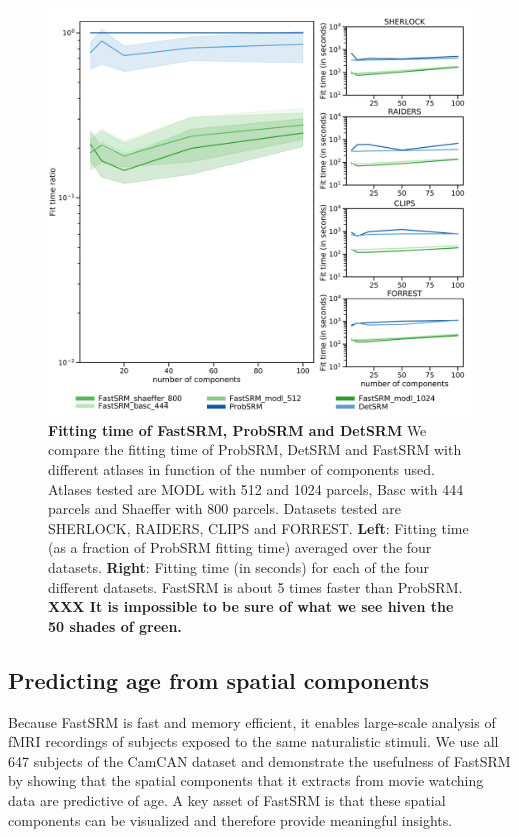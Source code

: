 \begin{figure}
\centering
\includegraphics[scale=0.33]{figures/srm/fit_time.pdf}

\caption{\textbf{Fitting time of FastSRM, ProbSRM and DetSRM} We compare the fitting time of ProbSRM, DetSRM and FastSRM with different atlases in function of the number of components used. Atlases tested are MODL with 512 and 1024 parcels, Basc with 444 parcels and Shaeffer with 800 parcels. Datasets tested are SHERLOCK, RAIDERS, CLIPS and FORREST.
\textbf{Left}: Fitting time (as a fraction of ProbSRM fitting time) averaged over the four datasets.
\textbf{Right}: Fitting time (in seconds) for each of the four different datasets.
FastSRM is about 5 times faster than ProbSRM.
\textbf{XXX It is impossible to be sure of what we see hiven the 50 shades of green.}}
\label{fig:fit_time}
\end{figure}

\subsection{Predicting age from spatial components}
Because FastSRM is fast and memory efficient, it enables large-scale analysis of fMRI recordings of subjects exposed to the same naturalistic stimuli.
%
We use all 647 subjects of the CamCAN dataset and demonstrate the usefulness of FastSRM by showing that the spatial components that it extracts from movie watching data are predictive of age.
%
A key asset of FastSRM is that these spatial components can be visualized and therefore provide meaningful insights. 

